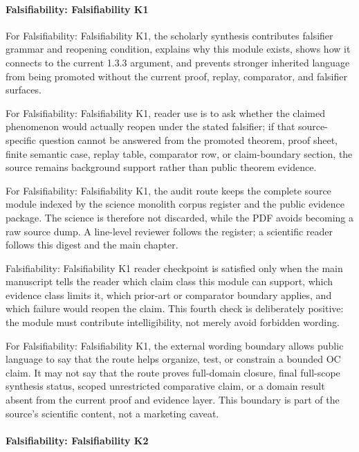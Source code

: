 \paragraph{Falsifiability: Falsifiability K1}

For Falsifiability: Falsifiability K1, the scholarly synthesis contributes falsifier grammar and reopening condition, explains why this module exists, shows how it connects to the current 1.3.3 argument, and prevents stronger inherited language from being promoted without the current proof, replay, comparator, and falsifier surfaces.


For Falsifiability: Falsifiability K1, reader use is to ask whether the claimed phenomenon would actually reopen under the stated falsifier; if that source-specific question cannot be answered from the promoted theorem, proof sheet, finite semantic case, replay table, comparator row, or claim-boundary section, the source remains background support rather than public theorem evidence.


For Falsifiability: Falsifiability K1, the audit route keeps the complete source module indexed by the science monolith corpus register and the public evidence package. The science is therefore not discarded, while the PDF avoids becoming a raw source dump. A line-level reviewer follows the register; a scientific reader follows this digest and the main chapter.


Falsifiability: Falsifiability K1 reader checkpoint is satisfied only when the main manuscript tells the reader which claim class this module can support, which evidence class limits it, which prior-art or comparator boundary applies, and which failure would reopen the claim. This fourth check is deliberately positive: the module must contribute intelligibility, not merely avoid forbidden wording.


For Falsifiability: Falsifiability K1, the external wording boundary allows public language to say that the route helps organize, test, or constrain a bounded OC claim. It may not say that the route proves full-domain closure, final full-scope synthesis status, scoped unrestricted comparative claim, or a domain result absent from the current proof and evidence layer. This boundary is part of the source's scientific content, not a marketing caveat.


\paragraph{Falsifiability: Falsifiability K2}

